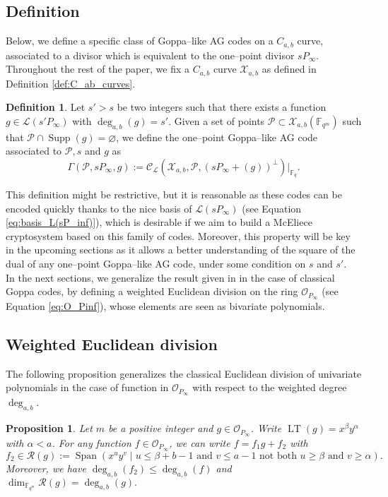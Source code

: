 \documentclass[a4paper]{amsart}
\newtheorem{proposition}[thm]{Proposition}
\theoremstyle{definition}
\newtheorem{definition}[thm]{Definition}
\theoremstyle{remark}
\newcommand{\calP}{\mathcal{P}}
\newcommand{\calL}{\mathcal{L}}
\newcommand{\calC}{\mathcal{C}}
\newcommand{\calO}{\mathcal{O}}
\newcommand{\calR}{\mathcal{R}}
\newcommand{\calX}{\mathcal{X}}
\newcommand{\fqm}{\mathbb{F}_{q^m}}
\newcommand{\fq}{\mathbb{F}_{q}}
\newcommand{\F}{\mathbb{F}}
\newcommand{\Span}[1]{\operatorname{Span}\left(#1\right)}
\newcommand{\LT}[1]{\operatorname{LT}\left(#1\right)}
\newcommand{\Supp}{\operatorname{Supp}}
\newcommand{\degab}[1]{\deg_{a,b}\left(#1\right)}
\begin{document}
\subsection{Definition}

Below, we define a specific class of Goppa--like AG codes on a $C_{a,b}$ curve, associated to a divisor which is equivalent to the one--point divisor $sP_\infty$. 
\noindent Throughout the rest of the paper, we fix a $C_{a,b}$ curve $\calX_{a,b}$ as defined in Definition \ref{def:C_ab_curves}.
\begin{definition} \label{def:one--point_Goppa--like_AG_codes_on_C_a,b_curves}
Let $s'>s$ be two integers such that there exists a function $g \in \calL(s'P_\infty)$ with $\degab{g}=s'$. Given a set of points  $\calP \subset \calX_{a,b}(\F_{q^m})$ such that $\calP \cap \Supp(g) = \varnothing$, we define the one--point Goppa--like AG code associated to $\calP,s$ and $g$ as 
\[\Gamma(\calP,sP_\infty,g) := \calC_{\calL}(\calX_{a,b},\calP,(sP_\infty+(g))^{\perp})|_{\fq}.\]
\end{definition}
This definition might be restrictive, but it is reasonable as these codes can be encoded quickly thanks to the nice basis of $\calL(sP_\infty)$ (see Equation \eqref{eq:basis_L(sP_inf)}), which is desirable if we aim to build a McEliece cryptosystem based on this family of codes. Moreover, this property will be key in the upcoming sections as it allows a better understanding of the square of the dual of any one--point Goppa--like AG code, under some condition on $s$ and $s'$. \\

\noindent In the next sections, we generalize the result given in \cite{MT21} in the case of classical Goppa codes, by defining a weighted Euclidean division on the ring $\calO_{P_\infty}$ (see Equation \eqref{eq:O_Pinf}), whose elements are seen as bivariate polynomials. 
\subsection{Weighted Euclidean division}
\noindent The following proposition generalizes the classical Euclidean division of univariate polynomials in the case of function in $\calO_{P_\infty}$ with respect to the weighted degree $\deg_{a,b}$.

\begin{proposition}\label{prop:div_grob}
Let $m$ be a positive integer and $g \in \calO_{P_\infty}$. Write $\LT{g}=x^\beta y^\alpha$ with $\alpha < a$.
For any function $f \in \calO_{P_\infty}$, we can write $f=f_1g+f_2$ with 
\[f_2 \in \calR(g):= \Span{x^u y^v \mid u \leq \beta + b-1 \text{ and } v\leq a-1 \text{ not both }  u \geq \beta \text{ and } v \geq \alpha}.\]
Moreover, we have $\degab{f_2} \leq \degab{f}$ and $\dim_{\fqm} \calR(g) = \degab{g}.$ 
\end{proposition}
\end{document}

